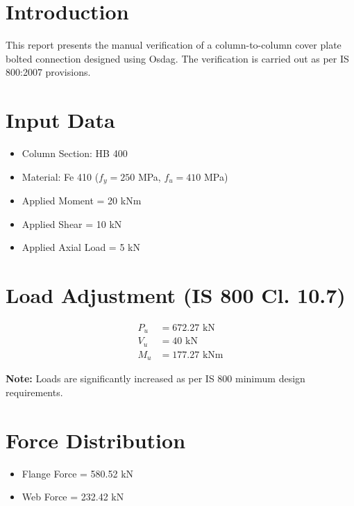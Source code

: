 



\maketitle

\section{Introduction}
This report presents the manual verification of a column-to-column cover plate bolted connection designed using Osdag. The verification is carried out as per IS 800:2007 provisions.

\section{Input Data}
\begin{itemize}
    \item Column Section: HB 400
    \item Material: Fe 410 ($f_y = 250$ MPa, $f_u = 410$ MPa)
    \item Applied Moment = 20 kNm
    \item Applied Shear = 10 kN
    \item Applied Axial Load = 5 kN
\end{itemize}

\section{Load Adjustment (IS 800 Cl. 10.7)}

\begin{align}
P_u &= 672.27 \text{ kN} \\
V_u &= 40 \text{ kN} \\
M_u &= 177.27 \text{ kNm}
\end{align}

\textbf{Note:} Loads are significantly increased as per IS 800 minimum design requirements.

\section{Force Distribution}

\begin{itemize}
    \item Flange Force = 580.52 kN
    \item Web Force = 232.42 kN
\end{itemize}

